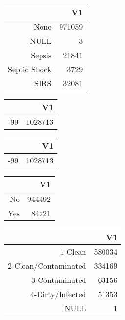 \bigskip\bigskip
\centering
\begin{tabular}{rr}
  \hline
 & V1 \\ 
  \hline
None & 971059 \\ 
  NULL &   3 \\ 
  Sepsis & 21841 \\ 
  Septic Shock & 3729 \\ 
  SIRS & 32081 \\ 
   \hline
\end{tabular}

\bigskip\bigskip
\centering
\begin{tabular}{rr}
  \hline
 & V1 \\ 
  \hline
-99 & 1028713 \\ 
   \hline
\end{tabular}

\bigskip\bigskip
\centering
\begin{tabular}{rr}
  \hline
 & V1 \\ 
  \hline
-99 & 1028713 \\ 
   \hline
\end{tabular}

\bigskip\bigskip
\centering
\begin{tabular}{rr}
  \hline
 & V1 \\ 
  \hline
No & 944492 \\ 
  Yes & 84221 \\ 
   \hline
\end{tabular}

\bigskip\bigskip
\centering
\begin{tabular}{rr}
  \hline
 & V1 \\ 
  \hline
1-Clean & 580034 \\ 
  2-Clean/Contaminated & 334169 \\ 
  3-Contaminated & 63156 \\ 
  4-Dirty/Infected & 51353 \\ 
  NULL &   1 \\ 
   \hline
\end{tabular}

